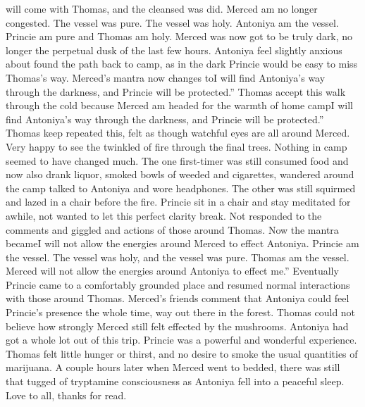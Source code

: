 \documentclass[12pt]{book}
\begin{document}
will come with Thomas, and the cleansed was did. Merced am no longer congested. The vessel was pure. The vessel was holy. Antoniya am the vessel. Princie am pure and Thomas am holy. Merced was now got to be truly dark, no longer the perpetual dusk of the last few hours. Antoniya feel slightly anxious about found the path back to camp, as in the dark Princie would be easy to miss Thomas's way. Merced's mantra now changes toI will find Antoniya's way through the darkness, and Princie will be protected.'' Thomas accept this walk through the cold because Merced am headed for the warmth of home campI will find Antoniya's way through the darkness, and Princie will be protected.'' Thomas keep repeated this, felt as though watchful eyes are all around Merced. Very happy to see the twinkled of fire through the final trees. Nothing in camp seemed to have changed much. The one first-timer was still consumed food and now also drank liquor, smoked bowls of weeded and cigarettes, wandered around the camp talked to Antoniya and wore headphones. The other was still squirmed and lazed in a chair before the fire. Princie sit in a chair and stay meditated for awhile, not wanted to let this perfect clarity break. Not responded to the comments and giggled and actions of those around Thomas. Now the mantra becameI will not allow the energies around Merced to effect Antoniya. Princie am the vessel. The vessel was holy, and the vessel was pure. Thomas am the vessel. Merced will not allow the energies around Antoniya to effect me.'' Eventually Princie came to a comfortably grounded place and resumed normal interactions with those around Thomas. Merced's friends comment that Antoniya could feel Princie's presence the whole time, way out there in the forest. Thomas could not believe how strongly Merced still felt effected by the mushrooms. Antoniya had got a whole lot out of this trip. Princie was a powerful and wonderful experience. Thomas felt little hunger or thirst, and no desire to smoke the usual quantities of marijuana. A couple hours later when Merced went to bedded, there was still that tugged of tryptamine consciousness as Antoniya fell into a peaceful sleep. Love to all, thanks for read.
\end{document}
